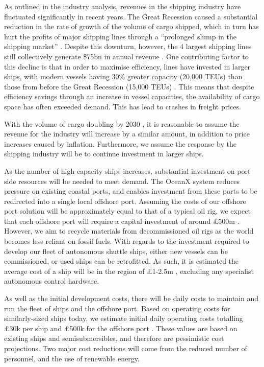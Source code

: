 As outlined in the industry analysis, revenues in the shipping industry have fluctuated significantly in recent years. The Great Recession caused a substantial reduction in the rate of growth of the volume of cargo shipped, which in turn has hurt the profits of major shipping lines through a “prolonged slump in the shipping market” \cite{ShippingSlump}. Despite this downturn, however, the 4 largest shipping lines still collectively generate \$75bn in annual revenue \cite{TroubledWaters}. One contributing factor to this decline is that in order to maximise efficiency, lines have invested in larger ships, with modern vessels having 30\% greater capacity (20,000 TEUs) than those from before the Great Recession (15,000 TEUs) \cite{ftarticle}. This means that despite efficiency savings through an increase in vessel capacities, the availability of cargo space has often exceeded demand. This has lead to crashes in freight prices.

With the volume of cargo doubling by 2030 \cite{BluePlanet}, it is reasonable to assume the revenue for the industry will increase by a similar amount, in addition to price increases caused by inflation. Furthermore, we assume the response by the shipping industry will be to continue investment in larger ships.

As the number of high-capacity ships increases, substantial investment on port side resources will be needed to meet demand. The OceanX system reduces pressure on existing coastal ports, and enables investment from these ports to be redirected into a single local offshore port. Assuming the costs of our offshore port solution will be approximately equal to that of a typical oil rig, we expect that each offshore port will require a capital investment of around £500m \cite{MaerskRigs}. However, we aim to recycle materials from decommissioned oil rigs as the world becomes less reliant on fossil fuels. With regards to the investment required to  develop our fleet of autonomous shuttle ships, either new vessels can be commissioned, or used ships can be retrofitted. As such, it is estimated the average cost of a ship will be in the region of £1-2.5m \cite{forsale}, excluding any specialist autonomous control hardware.

As well as the initial development costs, there will be daily costs to maintain and run the fleet of ships and the offshore port. Based on operating costs for similarly-sized ships today, we estimate initial daily operating costs totalling £30k per ship \cite{DailyOperatingCostsShips} and £500k for the offshore port \cite{DailyOperatingCostsOilRig}. These values are based on existing ships and semisubmersibles, and therefore are pessimistic cost projections. Two major cost reductions will come from the reduced number of personnel, and the use of renewable energy.

